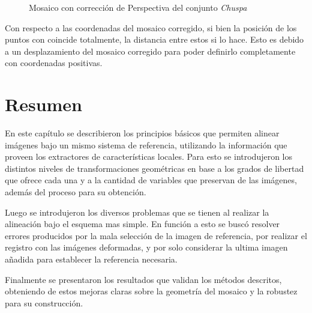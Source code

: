 \begin{figure}[H]
	\centering     %
	\hspace{1mm}%
	\caption[Mosaico con corrección de Perspectiva]{Mosaico con corrección de Perspectiva del conjunto \textit{Chuspa}}
	\label{imagen:ec:0234_3}
\end{figure}

Con respecto a las coordenadas del mosaico corregido, si bien la posición de los puntos con coincide totalmente, la distancia entre estos si lo hace. Esto es debido a un desplazamiento del mosaico corregido para poder definirlo completamente con coordenadas positivas. 

\section{Resumen}

En este capítulo se describieron los principios básicos que permiten alinear imágenes bajo un mismo sistema de referencia, utilizando la información que proveen los extractores de características locales. Para esto se introdujeron los distintos niveles de transformaciones geométricas en base a los grados de libertad que ofrece cada una y a la cantidad de variables que preservan de las imágenes, además del proceso para su obtención.

Luego se introdujeron los diversos problemas que se tienen al realizar la alineación bajo el esquema mas simple. En función a esto se buscó resolver errores producidos por la mala selección de la imagen de referencia, por realizar el registro con las imágenes deformadas, y por solo considerar la ultima imagen añadida para establecer la referencia necesaria.

Finalmente se presentaron los resultados que validan los métodos descritos, obteniendo de estos mejoras claras sobre la geometría del mosaico y la robustez para su construcción.


